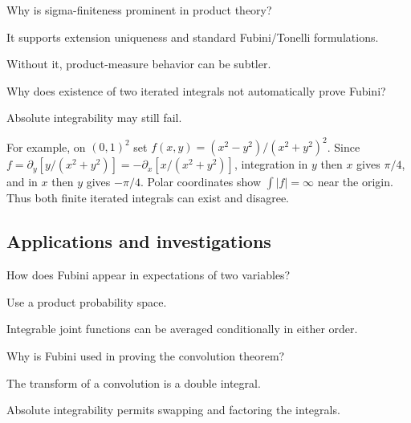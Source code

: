 \begin{exercise}\label{exr:iii05-expand-11}
Why is sigma-finiteness prominent in product theory?
\end{exercise}
\begin{hint}
It supports extension uniqueness and standard Fubini/Tonelli formulations.
\end{hint}
\begin{solution}
Without it, product-measure behavior can be subtler.
\end{solution}

\begin{exercise}\label{exr:iii05-expand-12}
Why does existence of two iterated integrals not automatically prove Fubini?
\end{exercise}
\begin{hint}
Absolute integrability may still fail.
\end{hint}
\begin{solution}
For example, on $(0,1)^2$ set $f(x,y)=(x^2-y^2)/(x^2+y^2)^2$. Since $f=\partial_y[y/(x^2+y^2)]=-\partial_x[x/(x^2+y^2)]$, integration in $y$ then $x$ gives $\pi/4$, and in $x$ then $y$ gives $-\pi/4$. Polar coordinates show $\int|f|=\infty$ near the origin. Thus both finite iterated integrals can exist and disagree.
\end{solution}

\subsection*{Applications and investigations}

\begin{exercise}[Probability]\label{exr:iii05-expand-13}
How does Fubini appear in expectations of two variables?
\end{exercise}
\begin{hint}
Use a product probability space.
\end{hint}
\begin{solution}
Integrable joint functions can be averaged conditionally in either order.
\end{solution}

\begin{exercise}\label{exr:iii05-expand-14}
Why is Fubini used in proving the convolution theorem?
\end{exercise}
\begin{hint}
The transform of a convolution is a double integral.
\end{hint}
\begin{solution}
Absolute integrability permits swapping and factoring the integrals.
\end{solution}

